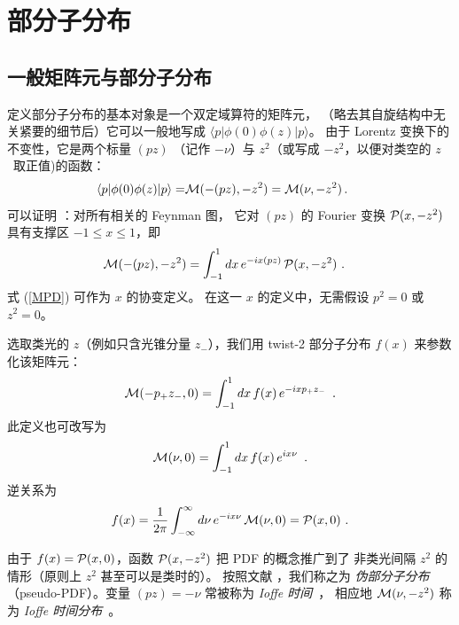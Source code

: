 \section{部分子分布}

\subsection{一般矩阵元与部分子分布}

定义部分子分布的基本对象是一个双定域算符的矩阵元，
（略去其自旋结构中无关紧要的细节后）它可以一般地写成
$\langle  p | \phi (0)  \phi(z)  | p \rangle $。
由于 Lorentz 变换下的不变性，它是两个标量 $(pz)$
（记作 $-\nu$）与 $z^2$（或写成 $-z^2$，以便对类空的 \mbox{$z$ 取正值)}的函数：
  \begin{align}
  \langle p |   \phi(0) \phi (z)|p \rangle %
=  & {\cal M} (-(pz), -z^2)  =  {\cal M} (\nu, -z^2)
\,  .
 \
 \label{lorentz}
\end{align}
可以证明 \cite{Radyushkin:2016hsy,Radyushkin:1983wh}：对所有相关的 Feynman 图，
它对 $(pz)$ 的 Fourier 变换 ${\cal P} (x, -z^2)$ 具有支撑区 $-1 \leq x \leq 1$，即
   \begin{align}
 {\cal M} (-(pz), -z^2)
&   =
 \int_{-1}^1 dx
 \, e^{-i x (pz) } \,  {\cal P} (x, -z^2)  \   .
  \label{MPD}
\end{align}
式 (\ref{MPD}) 可作为 $x$ 的协变定义。
在这一 $x$ 的定义中，无需假设 $p^2=0$ 或 $z^2=0$。

选取类光的 $z$（例如只含光锥分量 $z_-$），我们用 twist-2 部分子分布
$f(x)$ 来参数化该矩阵元：
  \begin{align}
  {\cal M} (-p_+ z_- , 0)  =
   \int_{-1}^1 dx \, f(x) \,
e^{-ixp_+ z_-} \,  \   .
 \label{twist2par0}
\end{align}
此定义也可改写为
  \begin{align}
  {\cal M} (\nu, 0)  =
   \int_{-1}^1 dx \, f(x) \,
e^{ix\nu} \,  \  .
 \label{twist2par1}
\end{align}
逆关系为
\begin{align}
 f  (x)  =\frac{1}{2 \pi}  \int_{-\infty}^{\infty}  d\nu \, e^{-i x \nu}  \, {\cal M}(\nu , 0)    = {\cal P} (x, 0)
  \  .
\label{fxMnu}
\end{align}

由于 $f(x) =   {\cal P} (x, 0) $，函数 $ {\cal P} (x, -z^2) $ 把 PDF 的概念推广到了
非类光间隔 $z^2$ 的情形（原则上 $z^2$ 甚至可以是类时的）。
按照文献 \cite{Radyushkin:2017cyf}，我们称之为
{\it 伪部分子分布}（pseudo-PDF）。变量 $(pz)=-\nu $ 常被称为
{\it Ioffe 时间}\ \cite{Ioffe:1969kf}，
相应地 ${\cal M}(\nu , -z^2) $ 称为 {\it Ioffe 时间分布}\ \cite{Braun:1994jq}。


